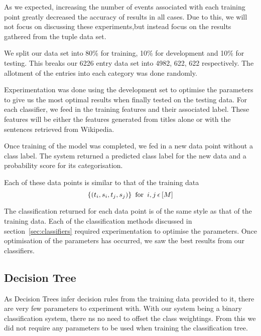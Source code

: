 \documentclass[bsc,frontabs,twoside,singlespacing,parskip,deptreport]{infthesis}     %
\begin{document}
As we expected, increasing the number of events associated with each training point greatly decreased the accuracy of results in all cases.
Due to this, we will not focus on discussing these experiments,but instead focus on the results gathered from the tuple data set.

We split our data set into 80\% for training, 10\% for development and 10\% for testing.
This breaks our 6226 entry data set into 4982, 622, 622 respectively.
The allotment of the entries into each category was done randomly.

Experimentation was done using the development set to optimise the parameters to give us the most optimal results
when finally tested on the testing data.
For each classifier, we feed in the training features and their associated label. These features will
be either the features generated from titles alone or with the sentences retrieved from Wikipedia.

Once training of the model was completed, we fed in a new data point without a class label.
The system returned a predicted class label for the new data and a probability score for its categorisation.

Each of these data points is similar to that of the training data
 \begin{equation}
   \{(t_{i},s_{i},t_{j},s_{j})\} \hspace{0.5em} \text{for} \hspace{0.5em} i,j \hspace{0.2em}\epsilon \hspace{0.2em}[M]\nonumber
 \end{equation}

 The classification returned for each data point is of the same style as that of the training data.
 Each of the classification methods discussed in section~\ref{sec:classifiers} required experimentation to optimise the
 parameters. Once optimisation of the parameters has occurred, we saw the best results from our classifiers.

 \subsection{Decision Tree}
 As Decision Trees infer decision rules from the training data provided to it, there are very few parameters to
 experiment with. With our system being a binary classification system, there  ns no need to offset the class weightings.
 From this we did not require any parameters to be used when training the classification tree.
 
\end{document}
